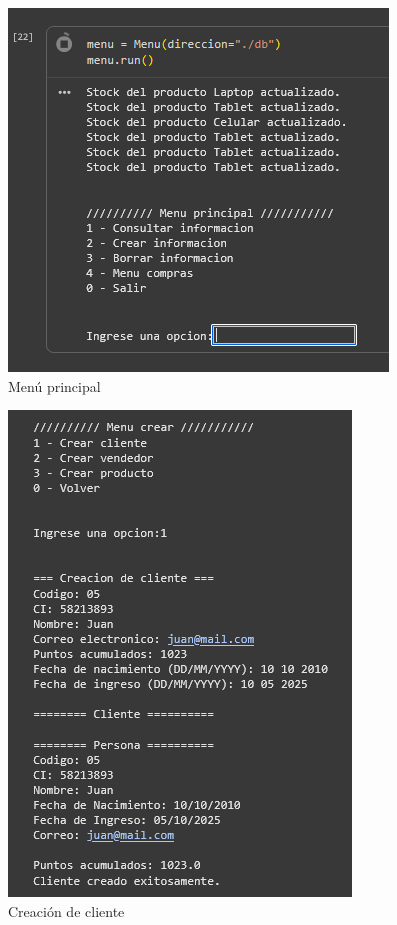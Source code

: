 \documentclass[11pt]{article}
\begin{document}
\begin{multicols}{2}
\centering

\begin{figure}[H]
    \centering
    \includegraphics[width=0.5\linewidth]{./anexos/evidencias/menuPrincipal.png}
    \caption{Menú principal}
    \label{fig:menuPrincipal}
\end{figure}

\begin{figure}[H]
    \centering
    \includegraphics[width=0.5\linewidth]{./anexos/evidencias/crearCliente.png}
    \caption{Creación de cliente}
    \label{fig:crearCliente}
\end{figure}


\end{multicols}
\end{document}
